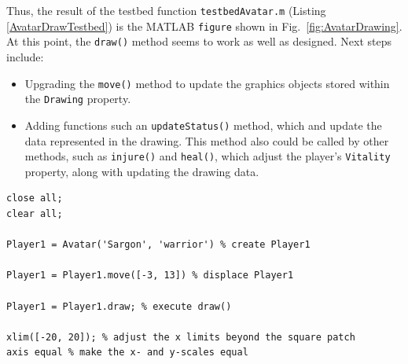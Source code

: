 Thus, the result of the testbed function \texttt{testbedAvatar.m} (Listing \ref{AvatarDrawTestbed}) is the MATLAB \texttt{figure} shown in Fig.\ \ref{fig:AvatarDrawing}. At this point, the \texttt{draw()} method seems to work as well as designed. Next steps include:
\begin{itemize}
\item Upgrading the \texttt{move()} method to update the graphics objects stored within the \texttt{Drawing} property.
\item Adding functions such an \texttt{updateStatus()} method, which and update the data represented in the drawing. This method also could be called by other methods, such as \texttt{injure()} and \texttt{heal()}, which adjust the player's \texttt{Vitality} property, along with updating the drawing data.
\end{itemize}
\begin{lstlisting}[style=Matlab-editor, label=AvatarDrawTestbed, caption={A testbed function tests the new \texttt{draw()} method.}]
% testbedAvatar.m
close all;
clear all;

Player1 = Avatar('Sargon', 'warrior') % create Player1

Player1 = Player1.move([-3, 13]) % displace Player1

Player1 = Player1.draw; % execute draw()

xlim([-20, 20]); % adjust the x limits beyond the square patch
axis equal % make the x- and y-scales equal
\end{lstlisting}

